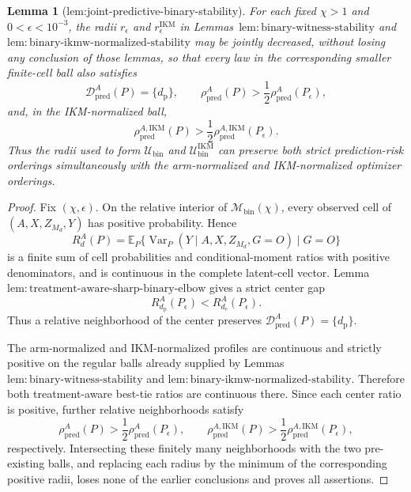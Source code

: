 \documentclass{article}
\newtheorem{lemma}{Lemma}
\begin{document}
\begin{lemma}[lem:joint-predictive-binary-stability]\label{lem:joint-predictive-binary-stability}
For each fixed \(\chi>1\) and \(0<\epsilon<10^{-3}\), the radii \(r_\epsilon\) and \(r_\epsilon^{\mathrm{IKM}}\) in Lemmas~\(\mathrm{lem{:}binary\text{-}witness\text{-}stability}\) and \(\mathrm{lem{:}binary\text{-}ikmw\text{-}normalized\text{-}stability}\) may be jointly decreased, without losing any conclusion of those lemmas, so that every law in the corresponding smaller finite-cell ball also satisfies
\[
 \mathcal D_{\mathrm{pred}}^A(P)=\{d_{\mathrm p}\},
 \qquad
 \rho_{\mathrm{pred}}^A(P)>\frac12\rho_{\mathrm{pred}}^A(P_\epsilon),
\]
and, in the IKM-normalized ball,
\[
 \rho_{\mathrm{pred}}^{A,\mathrm{IKM}}(P)
 >\frac12\rho_{\mathrm{pred}}^{A,\mathrm{IKM}}(P_\epsilon).
\]
Thus the radii used to form \(\mathcal U_{\mathrm{bin}}\) and \(\mathcal U_{\mathrm{bin}}^{\mathrm{IKM}}\) can preserve both strict prediction-risk orderings simultaneously with the arm-normalized and IKM-normalized optimizer orderings.
\end{lemma}
\begin{proof}
Fix \((\chi,\epsilon)\).  On the relative interior of \(\mathcal M_{\mathrm{bin}}(\chi)\), every observed cell of \((A,X,Z_{M_d},Y)\) has positive probability.  Hence
\[
 R_d^A(P)=
 \mathbb E_P\{\operatorname{Var}_P(Y\mid A,X,Z_{M_d},G=O)\mid G=O\}
\]
is a finite sum of cell probabilities and conditional-moment ratios with positive denominators, and is continuous in the complete latent-cell vector.  Lemma~\(\mathrm{lem{:}treatment\text{-}aware\text{-}sharp\text{-}binary\text{-}elbow}\) gives a strict center gap
\[
 R_{d_{\mathrm p}}^A(P_\epsilon)<R_{d_{\mathrm e}}^A(P_\epsilon).
\]
Thus a relative neighborhood of the center preserves \(\mathcal D_{\mathrm{pred}}^A(P)=\{d_{\mathrm p}\}\).

The arm-normalized and IKM-normalized profiles are continuous and strictly positive on the regular balls already supplied by Lemmas~\(\mathrm{lem{:}binary\text{-}witness\text{-}stability}\) and \(\mathrm{lem{:}binary\text{-}ikmw\text{-}normalized\text{-}stability}\).  Therefore both treatment-aware best-tie ratios are continuous there.  Since each center ratio is positive, further relative neighborhoods satisfy
\[
 \rho_{\mathrm{pred}}^A(P)
 >\frac12\rho_{\mathrm{pred}}^A(P_\epsilon),
 \qquad
 \rho_{\mathrm{pred}}^{A,\mathrm{IKM}}(P)
 >\frac12\rho_{\mathrm{pred}}^{A,\mathrm{IKM}}(P_\epsilon),
\]
respectively.  Intersecting these finitely many neighborhoods with the two pre-existing balls, and replacing each radius by the minimum of the corresponding positive radii, loses none of the earlier conclusions and proves all assertions.
\end{proof}
\end{document}
